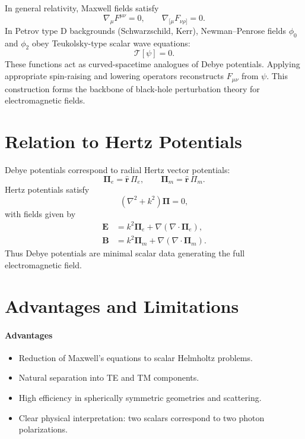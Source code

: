 \documentclass[11pt]{article}
\begin{document}
In general relativity, Maxwell fields satisfy
\begin{equation}
\nabla_\mu F^{\mu\nu} = 0, \qquad
\nabla_{[\mu} F_{\nu\rho]} = 0.
\end{equation}
In Petrov type D backgrounds (Schwarzschild, Kerr), Newman--Penrose
fields $\phi_0$ and $\phi_2$ obey Teukolsky-type scalar wave equations:
\begin{equation}
\mathcal{T}\![\psi] = 0.
\end{equation}
These functions act as curved-spacetime analogues of Debye potentials.
Applying appropriate spin-raising and lowering operators reconstructs
$F_{\mu\nu}$ from $\psi$. This construction forms the backbone of
black-hole perturbation theory for electromagnetic fields.

\section{Relation to Hertz Potentials}

Debye potentials correspond to radial Hertz vector potentials:
\begin{equation}
\mathbf{\Pi}_e = \hat{\mathbf{r}}\, \Pi_e,
\qquad
\mathbf{\Pi}_m = \hat{\mathbf{r}}\, \Pi_m.
\end{equation}
Hertz potentials satisfy
\begin{equation}
(\nabla^2 + k^2)\mathbf{\Pi} = 0,
\end{equation}
with fields given by
\begin{align}
\mathbf{E}
 &= k^2 \mathbf{\Pi}_e + \nabla (\nabla\!\cdot\mathbf{\Pi}_e), \\
\mathbf{B}
 &= k^2 \mathbf{\Pi}_m + \nabla (\nabla\!\cdot\mathbf{\Pi}_m).
\end{align}
Thus Debye potentials are minimal scalar data generating the full
electromagnetic field.

\section{Advantages and Limitations}

\paragraph{Advantages}
\begin{itemize}
\item Reduction of Maxwell's equations to scalar Helmholtz problems.
\item Natural separation into TE and TM components.
\item High efficiency in spherically symmetric geometries and scattering.
\item Clear physical interpretation: two scalars correspond to two photon polarizations.
\end{itemize}
\end{document}

